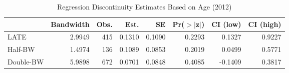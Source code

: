 \begin{table}[ht]
\centering
\begin{tabular}{lrrrrrrr}
  \hline
 & Bandwidth & Obs. & Est. & SE & Pr($>$$|$z$|$) & CI (low) & CI (high) \\ 
  \hline
LATE & 2.9949 & 415 & 0.1310 & 0.1090 & 0.2293 & 0.1327 & 0.9227 \\ 
  Half-BW & 1.4974 & 136 & 0.1089 & 0.0853 & 0.2019 & 0.0499 & 0.5771 \\ 
  Double-BW & 5.9898 & 672 & 0.0701 & 0.0848 & 0.4085 & -0.1409 & 0.3817 \\ 
   \hline
\end{tabular}
\caption{Regression Discontinuity Estimates Based on Age (2012)} 
\label{tab:rd2012y}
\end{table}
